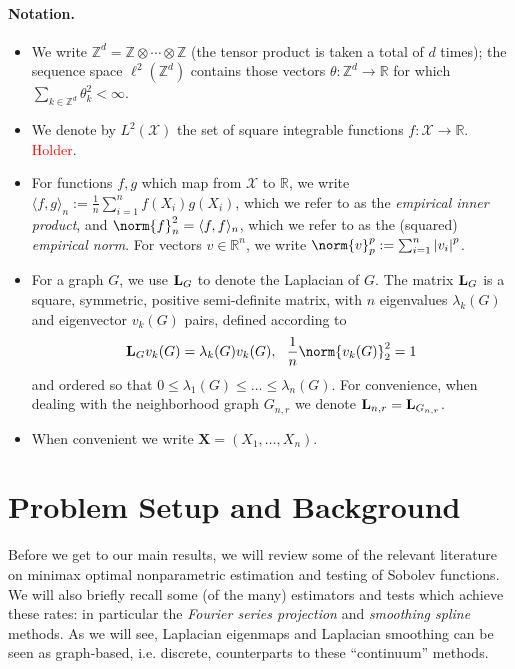 \documentclass{article}
\newcommand{\Reals}{\mathbb{R}}
\newcommand{\abs}[1]{\left \lvert #1 \right \rvert}
\newcommand{\1}{\mathbf{1}}
\newcommand{\Lap}{{\bf L}}
\newcommand{\Xset}{\mathcal{X}}
\newcommand{\Leb}{L}
\newcommand{\dotp}[2]{\langle #1, #2 \rangle}
\theoremstyle{alden}
\theoremstyle{aldenthm}
\theoremstyle{definition}
\theoremstyle{remark}
\begin{document}
\paragraph{Notation.}
\begin{itemize}
	\item We write $\mathbb{Z}^d = \mathbb{Z} \otimes \cdots \otimes \mathbb{Z}$ (the tensor product is taken a total of $d$ times); the sequence space $\ell^2(\mathbb{Z}^d)$ contains those vectors $\theta: \mathbb{Z}^d \to \Reals$ for which $\sum_{k \in \mathbb{Z}^d} \theta_k^2 < \infty$. 
	\item We denote by $\Leb^2(\Xset)$ the set of square integrable functions $f:\Xset \to \Reals$. \textcolor{red}{Holder}.
	\item For functions $f,g$ which map from $\Xset$ to $\Reals$, we write $\dotp{f}{g}_n := \frac{1}{n}\sum_{i = 1}^{n} f(X_i) g(X_i)$, which we refer to as the \emph{empirical inner product}, and $\norm{f}_n^2 = \dotp{f}{f}_n$, which we refer to as the (squared) \emph{empirical norm}. For vectors $v \in \Reals^n$, we write $\norm{v}_p^p := \sum_{i = 1}^{n} \abs{v_i}^p$.
	\item For a graph $G$, we use $\Lap_G$ to denote the Laplacian of $G$. The matrix $\Lap_G$ is a square, symmetric, positive semi-definite matrix, with $n$ eigenvalues $\lambda_k(G)$ and eigenvector $v_k(G)$ pairs, defined according to
	\begin{equation*}
	\Lap_G v_k(G) = \lambda_k(G) v_k(G), ~~\frac{1}{n} \norm{v_k(G)}_2^2 = 1 
	\end{equation*}
	and ordered so that $0 \leq \lambda_1(G) \leq \ldots \leq \lambda_n(G)$. For convenience, when dealing with the neighborhood graph $G_{n,r}$ we denote $\Lap_{n,r} = \Lap_{G_{n,r}}$. 
	\item When convenient we write $\mathbf{X} = (X_1,\ldots,X_n)$. 
\end{itemize}

\section{Problem Setup and Background}
\label{sec:problem_setup_and_background}

Before we get to our main results, we will review some of the relevant literature on minimax optimal nonparametric estimation and testing of Sobolev functions. We will also briefly recall some (of the many) estimators and tests which achieve these rates: in particular the \emph{Fourier series projection} and \emph{smoothing spline} methods. As we will see, Laplacian eigenmaps and Laplacian smoothing can be seen as graph-based, i.e. discrete, counterparts to these ``continuum'' methods.
\end{document}
